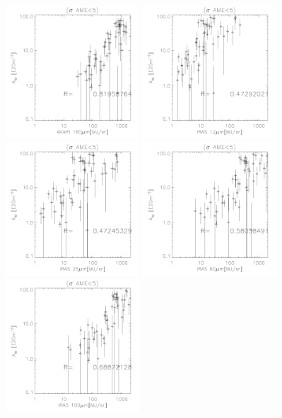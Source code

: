 \begin{figure}[!htb]
  \includegraphics[width=50mm]{IRIntMWAmp/akari160_Asp_nosp.pdf}
  \includegraphics[width=50mm]{IRIntMWAmp/iras12_Asp_nosp.pdf}
  \includegraphics[width=50mm]{IRIntMWAmp/iras25_Asp_nosp.pdf}
  \includegraphics[width=50mm]{IRIntMWAmp/iras60_Asp_nosp.pdf}
  \includegraphics[width=50mm]{IRIntMWAmp/iras100_Asp_nosp.pdf}

\end{figure}
